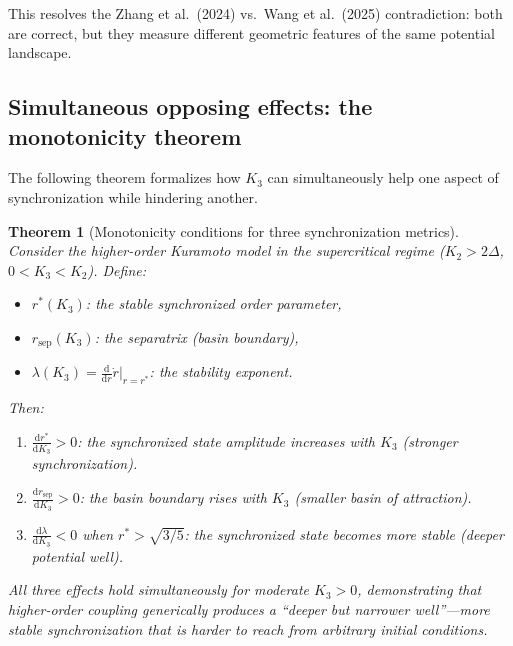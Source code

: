 \documentclass{article}
\newtheorem{theorem}{Theorem}
\newcommand{\dd}{\mathrm{d}}
\begin{document}
This resolves the Zhang et al.\ (2024) vs.\ Wang et al.\ (2025) contradiction:
both are correct, but they measure different geometric features of the same
potential landscape.

\subsection{Simultaneous opposing effects: the monotonicity theorem}

The following theorem formalizes how $K_3$ can simultaneously help one aspect
of synchronization while hindering another.

\begin{theorem}[Monotonicity conditions for three synchronization metrics]
\label{thm:monotonicity}
  Consider the higher-order Kuramoto model in the supercritical regime
  ($K_2>2\Delta$, $0<K_3<K_2$).  Define:
  \begin{itemize}
    \item $r^*(K_3)$: the stable synchronized order parameter,
    \item $r_{\mathrm{sep}}(K_3)$: the separatrix (basin boundary),
    \item $\lambda(K_3) = \frac{\dd}{\dd r}\dot{r}\big|_{r=r^*}$: the
      stability exponent.
  \end{itemize}
  Then:
  \begin{enumerate}
    \item $\frac{\dd r^*}{\dd K_3} > 0$: the synchronized state amplitude
      \emph{increases} with $K_3$ (stronger synchronization).
    \item $\frac{\dd r_{\mathrm{sep}}}{\dd K_3} > 0$: the basin boundary
      \emph{rises} with $K_3$ (smaller basin of attraction).
    \item $\frac{\dd\lambda}{\dd K_3} < 0$ when $r^*>\sqrt{3/5}$: the
      synchronized state becomes \emph{more stable} (deeper potential well).
  \end{enumerate}
  All three effects hold simultaneously for moderate $K_3>0$, demonstrating
  that higher-order coupling generically produces a ``deeper but narrower
  well''---more stable synchronization that is harder to reach from arbitrary
  initial conditions.
\end{theorem}
\end{document}
